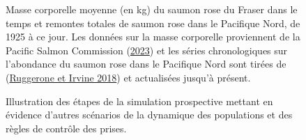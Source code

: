 \documentclass[french,11pt]{book}
\begin{document}
\begin{figure}[htb]

{\centering {} 

}

\caption{Masse corporelle moyenne (en kg) du saumon rose du Fraser dans le temps et remontes totales de saumon rose dans le Pacifique Nord, de 1925 à ce jour. Les données sur la masse corporelle proviennent de la Pacific Salmon Commission (\protect\hyperlink{ref-pacificsalmoncommissionPSCBiologicalData2023}{2023}) et les séries chronologiques sur l'abondance du saumon rose dans le Pacifique Nord sont tirées de (\protect\hyperlink{ref-ruggeroneNumbersBiomassNatural2018}{Ruggerone et Irvine 2018}) et actualisées jusqu'à présent.}\label{fig:fig-avg-mass}
\end{figure}

\begin{figure}[htb]

{\centering {} 

}

\caption{Illustration des étapes de la simulation prospective mettant en évidence d'autres scénarios de la dynamique des populations et des règles de contrôle des prises.}\label{fig:fig-schematic}
\end{figure}
\end{document}
